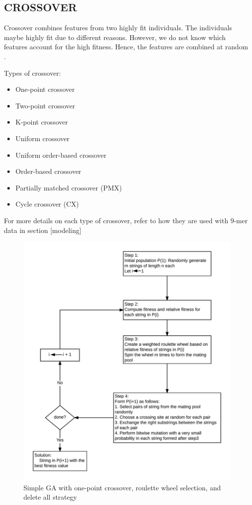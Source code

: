 \documentclass[12pt,a4paper]{article}
\begin{document}
	\subsection{CROSSOVER}
	Crossover combines features from two highly fit individuals. The individuals maybe highly fit due to different reasons. However, we do not know which features account for the high fitness. Hence, the features are combined at random \cite{goldberg}.  \par
	Types of crossover:
	\begin{itemize}
	\item One-point crossover
	\item Two-point crossover
	\item K-point crossover
	\item Uniform crossover
	\item Uniform order-based crossover
	\item Order-based crossover
	\item Partially matched crossover (PMX)
	\item Cycle crossover (CX)
	\end{itemize}

	For more details on each type of crossover, refer to how they are used with 9-mer data in section [modeling]

	\begin{figure}[H]
		\includegraphics[width=\textwidth,height=\textheight]{"GA-block2-algo"}
		\caption{Simple GA with one-point crossover, roulette wheel selection, and delete all strategy}
		\centering
	\end{figure}
\end{document}

